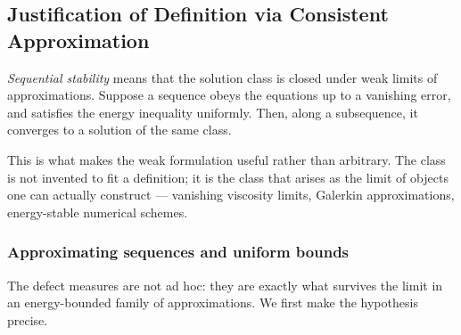 \documentclass[12pt,a4paper,twoside]{article}
\numberwithin{equation}{section}%
\begin{document}
\subsection{Justification of Definition via Consistent Approximation}
\label{sec:stability}

\emph{Sequential stability} means that the solution class is closed under weak limits of approximations. Suppose a sequence obeys the equations up to a vanishing error, and satisfies the energy inequality uniformly. Then, along a subsequence, it converges to a solution of the same class.

This is what makes the weak formulation useful rather than arbitrary. The class is not invented to fit a definition; it is the class that arises as the limit of objects one can actually construct --- vanishing viscosity limits, Galerkin approximations, energy-stable numerical schemes. 

\subsubsection{Approximating sequences and uniform bounds}
\label{sec:stability-bounds}

The defect measures are not ad hoc: they are exactly what survives the limit in an energy-bounded family of approximations. We first make the hypothesis precise.
\end{document}
